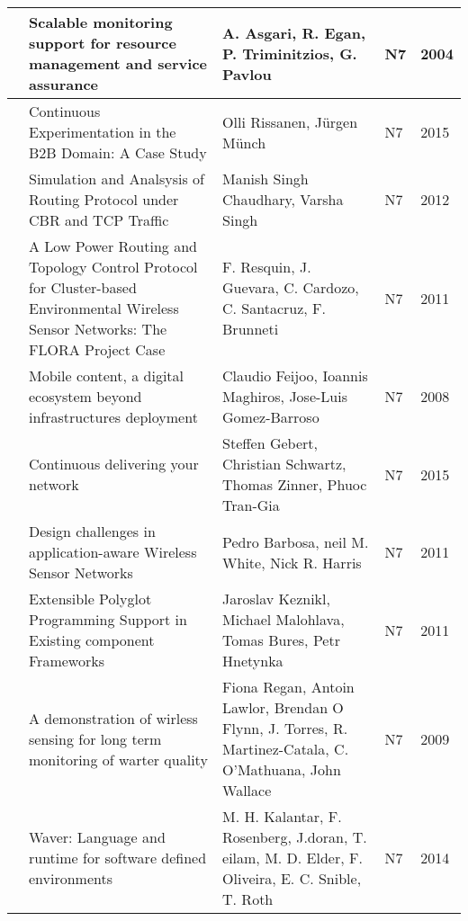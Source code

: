 \begin{landscape}
\begin{longtable}{|l|L{10cm}|L{10cm}|l|l|}
     & Scalable monitoring support for resource management and service assurance & A. Asgari, R. Egan, P. Triminitzios, G. Pavlou & N7 & 2004 \\ \hline
    
     & Continuous Experimentation in the B2B Domain: A Case Study & Olli Rissanen, Jürgen Münch & N7 & 2015 \\ \hline
    
     & Simulation and Analsysis of Routing Protocol under CBR and TCP Traffic & Manish Singh Chaudhary, Varsha Singh & N7 & 2012 \\ \hline
    
     & A Low Power Routing and Topology Control Protocol for Cluster-based Environmental Wireless Sensor Networks: The FLORA Project Case & F. Resquin, J. Guevara, C. Cardozo, C. Santacruz, F. Brunneti & N7 & 2011 \\ \hline
    
     & Mobile content, a digital ecosystem beyond infrastructures deployment & Claudio Feijoo, Ioannis Maghiros, Jose-Luis Gomez-Barroso & N7 & 2008 \\ \hline
    
      & Continuous delivering your network & Steffen Gebert, Christian Schwartz, Thomas Zinner, Phuoc Tran-Gia & N7 & 2015 \\ \hline
    
     & Design challenges in application-aware Wireless Sensor Networks & Pedro Barbosa, neil M. White, Nick R. Harris & N7 & 2011 \\ \hline
    
     & Extensible Polyglot Programming Support in Existing component Frameworks & Jaroslav Keznikl, Michael Malohlava, Tomas Bures, Petr Hnetynka & N7 & 2011 \\ \hline
    
     & A demonstration of wirless sensing for long term monitoring of warter quality & Fiona Regan, Antoin Lawlor, Brendan O Flynn, J. Torres, R. Martinez-Catala, C. O'Mathuana, John Wallace & N7 & 2009 \\ \hline
    
    
     & Waver: Language and runtime for software defined environments & M. H. Kalantar, F. Rosenberg, J.doran, T. eilam, M. D. Elder, F. Oliveira, E. C. Snible, T. Roth & N7 & 2014 \\ \hline
    

\end{longtable}
\end{landscape}
